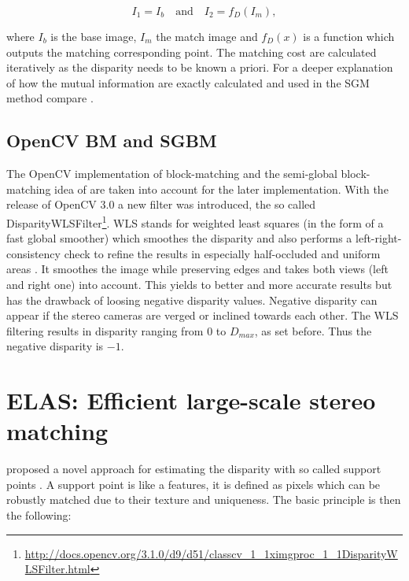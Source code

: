 \begin{equation}
    I_1 = I_b\quad \textrm{and}\quad I_2 = f_D(I_m),
\end{equation}

\noindent where $I_b$ is the base image, $I_m$ the match image and $f_D(x)$ is a function which outputs the matching corresponding point.
The matching cost are calculated iteratively as the disparity needs to be known a priori.
For a deeper explanation of how the mutual information are exactly calculated and used in the SGM method compare \citep{hirschmuller2005accurate, hirschmuller2007evaluation, hirschmuller2008stereo, hirschmuller2011semi}.

\subsection*{OpenCV BM and SGBM}

The OpenCV\citep{opencv_library} implementation of block-matching and the semi-global block-matching idea of \citeauthor{hirschmuller2005accurate} are taken into account for the later implementation.
\newline\newline\noindent With the release of OpenCV 3.0 \citep{opencv_library} a new filter was introduced, the so called DisparityWLSFilter\footnote{\url{http://docs.opencv.org/3.1.0/d9/d51/classcv_1_1ximgproc_1_1DisparityWLSFilter.html}}.
WLS stands for weighted least squares (in the form of a fast global smoother) which smoothes the disparity and also performs a left-right-consistency check to refine the results in especially half-occluded and uniform areas \citep{min2014fast}.
It smoothes the image while preserving edges and takes both views (left and right one) into account.
This yields to better and more accurate results but has the drawback of loosing negative disparity values.
Negative disparity can appear if the stereo cameras are verged or inclined towards each other.
The WLS filtering results in disparity ranging from $0$ to $D_{max}$, as set before.
Thus the negative disparity is $-1$.

\section{ELAS: Efficient large-scale stereo matching}

\citeauthor{Geiger2010ACCV} proposed a novel approach for estimating the disparity with so called support points \citep{Geiger2010ACCV, Geiger2011IV}.
A support point is like a features, it is defined as pixels which can be robustly matched due to their texture and uniqueness.
The basic principle is then the following:

